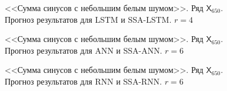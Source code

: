 \documentclass[specialist,
               substylefile = spbu.rtx,
               subf,href,colorlinks=true, 12p]{disser}
\begin{document}
\begin{figure}[H]
	\captionsetup{justification=centering}
	\caption{<<Сумма синусов с небольшим белым шумом>>. Ряд $\mathsf{X}_{650}$. Прогноз результатов для LSTM и SSA-LSTM. $r = 4$}
	\label{edsin0.3r_r4_res_lstm}
\end{figure}

\begin{figure}[H]
	\captionsetup{justification=centering}
	\caption{<<Сумма синусов с небольшим белым шумом>>. Ряд $\mathsf{X}_{650}$. Прогноз результатов для ANN и SSA-ANN. $r = 6$}
\end{figure}

\begin{figure}[H]
	\captionsetup{justification=centering}
	\caption{<<Сумма синусов с небольшим белым шумом>>. Ряд $\mathsf{X}_{650}$. Прогноз результатов для RNN и SSA-RNN. $r = 6$}
	\label{edsin0.3r_r6_res_rnn}
\end{figure}
\end{document}
